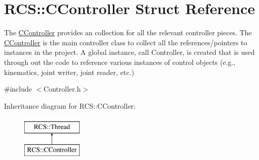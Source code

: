 \hypertarget{structRCS_1_1CController}{\section{R\-C\-S\-:\-:C\-Controller Struct Reference}
\label{structRCS_1_1CController}
}


The \hyperlink{structRCS_1_1CController}{C\-Controller} provides an collection for all the relevant controller pieces. The \hyperlink{structRCS_1_1CController}{C\-Controller} is the main controller class to collect all the references/pointers to instances in the project. A global instance, call Controller, is created that is used through out the code to reference various instances of control objects (e.\-g., kinematics, joint writer, joint reader, etc.)  




{\ttfamily \#include $<$Controller.\-h$>$}

Inheritance diagram for R\-C\-S\-:\-:C\-Controller\-:\begin{figure}[H]
\begin{center}
\leavevmode
\includegraphics[height=2.000000cm]{structRCS_1_1CController}
\end{center}
\end{figure}
